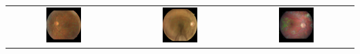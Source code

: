 \begin{frame}
{\begin{tabular}{@{}c@{}@{}c@{}@{}c@{}}
	\includegraphics[width=0.33\textwidth]{pics/classified_samples/197_left_0_blobs.jpg} &
	\includegraphics[width=0.33\textwidth]{pics/classified_samples/82_right_2_blobs.jpg} &
	\includegraphics[width=0.33\textwidth]{pics/classified_samples/2496_left_4_blobs.jpg} \\

\end{tabular}
}



\end{frame}
